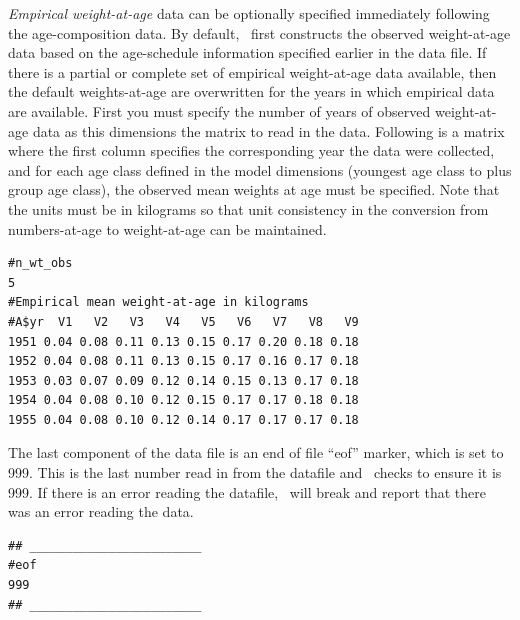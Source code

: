 \begin{multicols}{2}
\emph{Empirical weight-at-age} data can be optionally specified immediately following the age-composition data.  By default, \iscam\ first constructs the observed weight-at-age data based on the age-schedule information specified earlier in the data file.  If there is a partial or complete set of empirical weight-at-age data available, then the default weights-at-age are overwritten for the years in which empirical data are available.    First you must specify the number of years of observed weight-at-age data as this dimensions the matrix to read in the data.  Following is a matrix where the first column specifies the corresponding year the data were collected, and for each age class defined in the model dimensions (youngest age class to plus group age class), the observed mean weights at age must be specified.  Note that the units must be in kilograms so that unit consistency in the conversion from numbers-at-age to weight-at-age can be maintained.
\begin{footnotesize}
\begin{verbatim}
#n_wt_obs
5
#Empirical mean weight-at-age in kilograms 
#A$yr  V1   V2   V3   V4   V5   V6   V7   V8   V9
1951 0.04 0.08 0.11 0.13 0.15 0.17 0.20 0.18 0.18
1952 0.04 0.08 0.11 0.13 0.15 0.17 0.16 0.17 0.18
1953 0.03 0.07 0.09 0.12 0.14 0.15 0.13 0.17 0.18
1954 0.04 0.08 0.10 0.12 0.15 0.17 0.17 0.18 0.18
1955 0.04 0.08 0.10 0.12 0.14 0.17 0.17 0.17 0.18
\end{verbatim}
\end{footnotesize}


The last component of the data file is an end of file ``eof'' marker, which is set to 999.  This is the last number read in from the datafile and \iscam\ checks to ensure it is 999.  If there is an error reading the datafile, \iscam\ will break and report that there was an error reading the data.


\begin{verbatim}
## ________________________
#eof
999
## ________________________
\end{verbatim}

\end{multicols}
